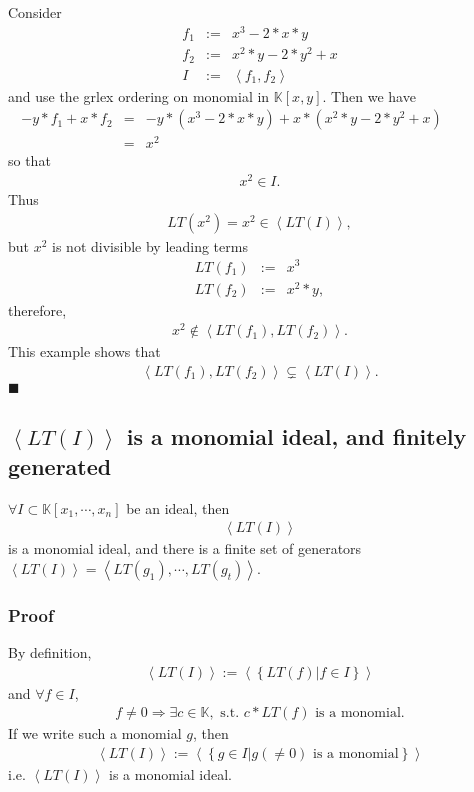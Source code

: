 \documentclass[11pt]{book}
\begin{document}
Consider
\begin{eqnarray}
f_1 &:=& x^3-2*x*y \\
f_2 &:=& x^2*y -2*y^2 + x \\
I &:=& \left< f_1, f_2 \right>
\end{eqnarray}
and use the grlex ordering on monomial in $\mathbb{K}[x,y]$.
Then we have
\begin{eqnarray}
-y * f_1+x * f_2 &=& -y * (x^3-2*x*y) + x * (x^2*y -2*y^2 + x) \qquad\qquad\\
&=& x^2
\end{eqnarray}
so that
\begin{eqnarray}
x^2 \in I.
\end{eqnarray}
Thus
\begin{eqnarray}
LT(x^2) = x^2 \in \left< LT(I)  \right>,
\end{eqnarray}
but $x^2$ is not divisible by leading terms
\begin{eqnarray}
LT(f_1) &:=& x^3 \\
LT(f_2) &:=& x^2 * y,
\end{eqnarray}
therefore,
\begin{eqnarray}
x^2 \notin \left< LT(f_1), LT(f_2)  \right>.
\end{eqnarray}
This example shows that
\begin{eqnarray}
\left< LT(f_1), LT(f_2)  \right> \subsetneq  \left< LT(I) \right>.
\end{eqnarray}
$\blacksquare$

\subsection{$\left< LT(I) \right>$ is a monomial ideal, and finitely generated}
\label{monomialIdeals}
$\forall I \subset \mathbb{K}[x_1, \cdots, x_{n}]$ be an ideal, then
\begin{eqnarray}
\left< LT(I) \right>
\end{eqnarray}
is a monomial ideal, and there is a finite set of generators $\left< LT(I) \right> = \left< LT(g_1), \cdots, LT(g_t) \right>$.

\subsubsection{Proof}
By definition,
\begin{eqnarray}
\left< LT(I) \right>  := \left< \left\{ \left. LT(f) \right| f \in I \right\} \right>
\end{eqnarray}
and $\forall f \in I$,
\begin{eqnarray}
f \neq 0 \Rightarrow \exists c \in \mathbb{K}, \text{ s.t. } c* LT(f) \text{ is a monomial}.
\end{eqnarray}
If we write such a monomial $g$, then
\begin{eqnarray}
\left< LT(I) \right>  := \left< \left\{ \left. g \in I \right| g (\neq 0) \text{ is a monomial} \right\} \right>
\end{eqnarray}
i.e. $\left< LT(I) \right> $ is a monomial ideal.
\end{document}
